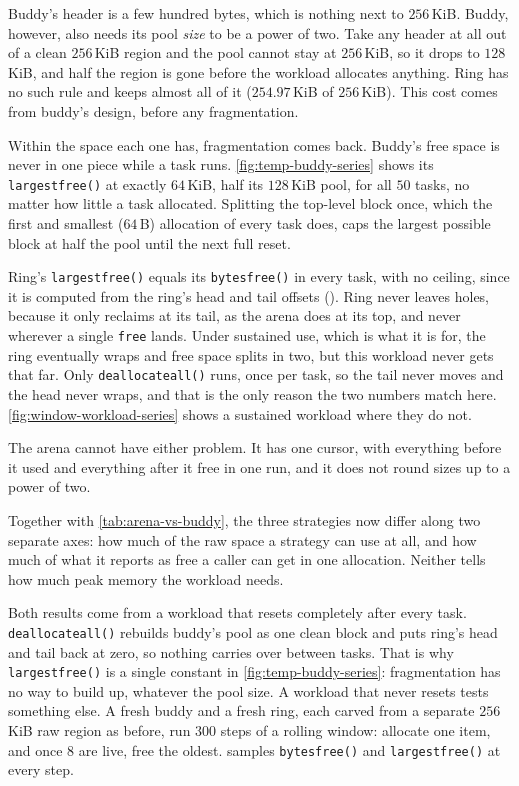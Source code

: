 \documentclass[12pt]{report}
\newcommand{\fullref}[1]{\Cref{#1}}
\renewcommand{\_}{\origunderscore\allowbreak}
\begin{document}


Buddy's header is a few hundred bytes, which is nothing next to $256$\,KiB. Buddy, however, also needs its pool \emph{size} to be a power of two. Take any header at all out of a clean $256$\,KiB region and the pool cannot stay at $256$\,KiB, so it drops to $128$\,KiB, and half the region is gone before the workload allocates anything. Ring has no such rule and keeps almost all of it ($254.97$\,KiB of $256$\,KiB). This cost comes from buddy's design, before any fragmentation.

Within the space each one has, fragmentation comes back. Buddy's free space is never in one piece while a task runs. \cref{fig:temp-buddy-series} shows its \texttt{largest\_free()} at exactly $64$\,KiB, half its $128$\,KiB pool, for all $50$ tasks, no matter how little a task allocated. Splitting the top-level block once, which the first and smallest ($64$\,B) allocation of every task does, caps the largest possible block at half the pool until the next full reset.

Ring's \texttt{largest\_free()} equals its \texttt{bytes\_free()} in every task, with no ceiling, since it is computed from the ring's head and tail offsets (\fullref{sec:allocator-integration}). Ring never leaves holes, because it only reclaims at its tail, as the arena does at its top, and never wherever a single \texttt{free} lands. Under sustained use, which is what it is for, the ring eventually wraps and free space splits in two, but this workload never gets that far. Only \texttt{deallocate\_all()} runs, once per task, so the tail never moves and the head never wraps, and that is the only reason the two numbers match here. \cref{fig:window-workload-series} shows a sustained workload where they do not.

The arena cannot have either problem. It has one cursor, with everything before it used and everything after it free in one run, and it does not round sizes up to a power of two.

Together with \cref{tab:arena-vs-buddy}, the three strategies now differ along two separate axes: how much of the raw space a strategy can use at all, and how much of what it reports as free a caller can get in one allocation. Neither tells how much peak memory the workload needs.

Both results come from a workload that resets completely after every task. \texttt{deallocate\_all()} rebuilds buddy's pool as one clean block and puts ring's head and tail back at zero, so nothing carries over between tasks. That is why \texttt{largest\_free()} is a single constant in \cref{fig:temp-buddy-series}: fragmentation has no way to build up, whatever the pool size. A workload that never resets tests something else. A fresh buddy and a fresh ring, each carved from a separate $256$\,KiB raw region as before, run $300$ steps of a rolling window: allocate one item, and once $8$ are live, free the oldest.  samples \texttt{bytes\_free()} and \texttt{largest\_free()} at every step.
\end{document}
